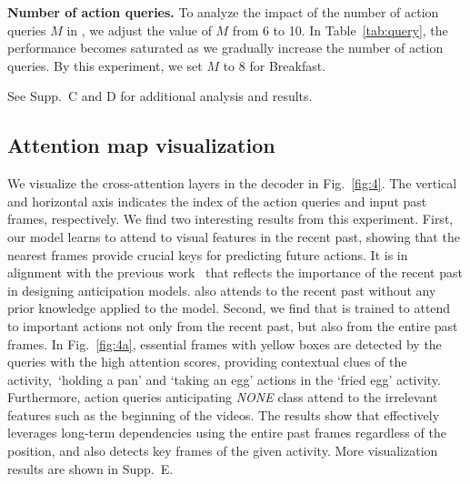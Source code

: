 \vspace{2mm}

\noindent
\textbf{Number of action queries.}
To analyze the impact of the number of action queries $M$ in \ours, we adjust the value of $M$ from 6 to 10. In Table~\ref{tab:query}, the performance becomes saturated as we gradually increase the number of action queries. By this experiment, we set $M$ to 8 for Breakfast.

See Supp.~C and D for additional analysis and results.

\subsection{Attention map visualization}
We visualize the cross-attention layers in the decoder in Fig.~\ref{fig:4}. The vertical and horizontal axis indicates the index of the action queries and input past frames, respectively. 
We find two interesting results from this experiment.
First, our model learns to attend to visual features in the recent past, showing that the nearest frames provide crucial keys for predicting future actions. 
It is in alignment with the previous work~\cite{ke2019time,sener2020temporal} that reflects the importance of the recent past in designing anticipation models.
\ours also attends to the recent past without any prior knowledge applied to the model.
Second, we find that \ours is trained to attend to important actions not only from the recent past, but also from the entire past frames. In Fig.~\ref{fig:4a}, essential frames with yellow boxes are detected by the queries with the high attention scores, providing contextual clues of the activity,~\eg `holding a pan' and `taking an egg' actions in the `fried egg' activity. Furthermore, action queries anticipating \textit{NONE} class attend to the irrelevant features such as the beginning of the videos. The results show that \ours effectively leverages long-term dependencies using the entire past frames regardless of the position, and also detects key frames of the given activity.
More visualization results are shown in Supp.~E.

